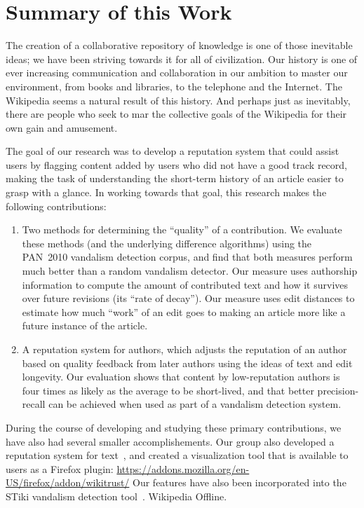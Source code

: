 \section{Summary of this Work}

The creation of a collaborative repository of knowledge is
one of those inevitable ideas; we have been striving towards it
for all of civilization.
Our history is one of ever increasing communication and collaboration
in our ambition to master our environment, from books and libraries,
to the telephone and the Internet.
The Wikipedia seems a natural result of this history.
And perhaps just as inevitably, there are people who seek to
mar the collective goals of the Wikipedia for their own gain and amusement.

The goal of our research was to develop a reputation system
that could assist users by flagging content added by users who
did not have a good track record, making the task of understanding
the short-term history of an article easier to grasp with a glance.
In working towards that goal, this research makes the following contributions:
\begin{enumerate}

\item Two methods for determining the ``quality'' of a contribution.
  We evaluate these methods (and the underlying difference algorithms)
  using the PAN~2010 vandalism detection corpus, and find that both
  measures perform much better than a random vandalism detector.
  Our  measure uses authorship information to
  compute the amount of contributed text and how it survives over
  future revisions (its ``rate of decay'').
  Our  measure uses edit distances to estimate
  how much ``work'' of an edit goes to making an article more like a
  future instance of the article.

\item A reputation system for authors,
  which adjusts the reputation of an author based on quality feedback
  from later authors using the ideas of text and edit longevity.
  Our evaluation shows that content by low-reputation authors is
  four times as likely as the average to be short-lived, and that better
  precision-recall can be achieved when used as part of a vandalism
  detection system.

\end{enumerate}

During the course of developing and studying these primary contributions,
we have also had several smaller accomplishements.
Our group also
  developed a reputation system for text~\cite{Adler2008b},
  and created a visualization
  tool that is available to users as a Firefox plugin:
  \url{https://addons.mozilla.org/en-US/firefox/addon/wikitrust/}
Our features have also been incorporated
  into the STiki vandalism detection tool~\cite{wiki:STiki}.
Wikipedia Offline.

